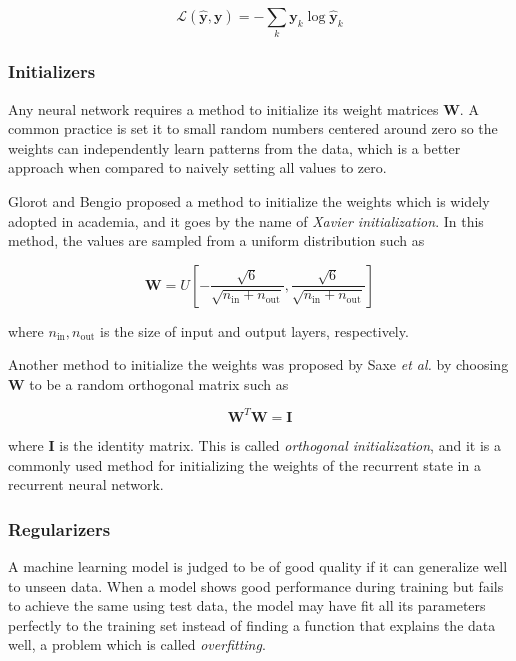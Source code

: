 \documentclass{kththesis}
\begin{document}
\begin{equation}
\mathcal{L}(\hat{\mathbf{y}}, \mathbf{y}) = - \sum_k \mathbf{y}_k \log \hat{\mathbf{y}}_k
\end{equation}

\subsubsection{Initializers}

Any neural network requires a method to initialize its weight matrices $\mathbf{W}$. A common practice is set it to small random numbers centered around zero so the weights can independently learn patterns from the data, which is a better approach when compared to naively setting all values to zero. 

Glorot and Bengio\citep{glorot2010understanding} proposed a method to initialize the weights which is widely adopted in academia, and it goes by the name of \emph{Xavier initialization}. In this method, the values are sampled from a uniform distribution such as

\begin{equation}
\mathbf{W} = \mathit{U}[-\frac{\sqrt{6}}{\sqrt{n_\text{in}+n_\text{out}}}, \frac{\sqrt{6}}{\sqrt{n_\text{in}+n_\text{out}}}] 
\end{equation}

where $n_\text{in}, n_\text{out}$ is the size of input and output layers, respectively. 

Another method to initialize the weights was proposed by Saxe \emph{et al.}\citep{saxe2013exact} by choosing $\mathbf{W}$ to be a random orthogonal matrix such as 

\begin{equation}
\mathbf{W}^T\mathbf{W} = \mathbf{I}
\end{equation}

where $\mathbf{I}$ is the identity matrix. This is called \emph{orthogonal initialization}, and it is a commonly used method for initializing the weights of the recurrent state in a recurrent neural network.

\subsubsection{Regularizers}

A machine learning model is judged to be of good quality if it can generalize well to unseen data. When a model shows good performance during training but fails to achieve the same using test data, the model may have fit all its parameters perfectly to the training set instead of finding a function that explains the data well, a problem which is called \emph{overfitting}. 
\end{document}
